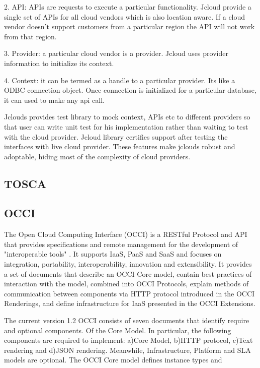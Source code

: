      2. API: APIs are requests to execute a particular
        functionality. Jcloud provide a single set of APIs for all
        cloud vendors which is also location aware. If a cloud vendor
        doesn’t support customers from a particular region the API
        will not work from that region.

     3. Provider: a particular cloud vendor is a provider. Jcloud uses
        provider information to initialize its context.

     4. Context: it can be termed as a handle to a particular
        provider. Its like a ODBC connection object. Once connection
        is initialized for a particular database, it can used to make
        any api call.

        Jclouds provides test library to mock context, APIs etc to
        different providers so that user can write unit test for his
        implementation rather than waiting to test with the cloud
        provider. Jcloud library certifies support after testing the
        interfaces with live cloud provider. These features make
        jclouds robust and adoptable, hiding most of the complexity of
        cloud providers.

\subsection{TOSCA}


\subsection{OCCI}

     The Open Cloud Computing Interface (OCCI) is a RESTful
     Protocol and API that provides specifications  and remote
     management for the development of "interoperable tools"
     \cite{www-occi}. It supports IaaS, PaaS and SaaS and
     focuses on integration, portability, interoperability,
     innovation and extensibility. It provides a set of documents
     that describe an OCCI Core model, contain best practices
     of interaction with the model, combined into OCCI Protocols,
     explain methods of communication between components via
     HTTP protocol introduced in the OCCI Renderings, and
     define infrastructure for IaaS presented in the OCCI
     Extensions.

     The current version 1.2 OCCI consists of seven documents that
     identify require and optional components. Of the Core Model.  In
     particular, the following components are required to implement:
     a)Core Model, b)HTTP protocol, c)Text rendering and d)JSON
     rendering. Meanwhile, Infrastructure, Platform and SLA models are
     optional.  The OCCI Core model defines instance types and

